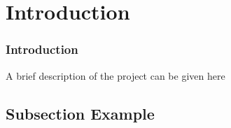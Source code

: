 

\section{Introduction} %
\begin{frame}
	
\frametitle{Introduction}

A brief description of the project can be given here

\end{frame}


\subsection{Subsection Example} %

